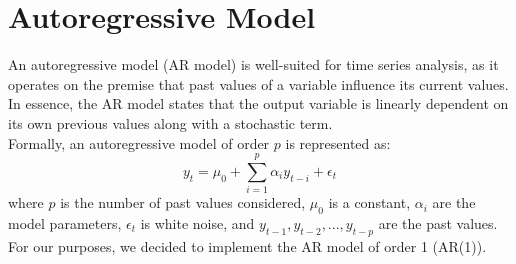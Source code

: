 \section{Autoregressive Model}
\label{sec:AR}
An autoregressive model (AR model) is well-suited for time series analysis, as it operates on the premise that past values of a variable influence its current values. In essence, the AR model states that the output variable is linearly dependent on its own previous values along with a stochastic term. \\
Formally, an autoregressive model of order $p$ is represented as:
\begin{equation}
    \label{eq:AR}
    y_{t} = \mu_{0} + \sum^{p}_{i=1}\alpha_{i} y_{t-i} + \epsilon_t
\end{equation}
where $p$ is the number of past values considered, $\mu_{0}$ is a constant, $\alpha_{i}$ are the model parameters, $\epsilon_{t}$ is white noise, and $y_{t-1}, y_{t-2}, ..., y_{t-p}$ are the past values. \\
For our purposes, we decided to implement the AR model of order 1 (AR(1)).
